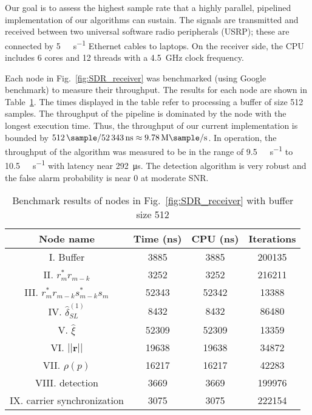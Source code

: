 Our goal is to assess the highest sample rate that a
highly parallel, pipelined implementation of our algorithms can sustain. 
The signals are transmitted and received between two universal software radio peripherals (USRP);
these are connected by \SI[per-mode=symbol]{5}{\giga\bits\per\second} Ethernet cables to
laptops.
On the receiver side, 
the CPU includes 6 cores and 12 threads with a \SI{4.5}{\giga\hertz}
clock frequency.

Each node in Fig.~\ref{fig:SDR_receiver} was benchmarked (using Google benchmark) to measure their throughput.
The results for each node are shown 
in Table~\ref{table:BM_function_nodes}.
The times displayed in the table
refer to processing a  buffer of size 512 samples.
The throughput of the 
pipeline is dominated by the node with the longest execution time.
Thus, the  throughput of our current implementation is bounded by
$\SI{512}{\sample}/\SI{52343}{\nano\second}  \approx \SI[per-mode=symbol]{9.78}{\mega\sample\per\second}$.
In operation, the throughput of the algorithm was measured to be in
the range of
\SI[per-mode=symbol]{9.5}{\mega\sample\per\second} to \SI[per-mode=symbol]{10.5}{\mega\sample\per\second} with latency near \SI{292}{\micro\second}.
The detection algorithm is very robust and the false alarm probability is near 0 at moderate SNR.

\begin{table}[t]
    \caption{Benchmark results of nodes in Fig.~\ref{fig:SDR_receiver} with buffer size 512}  %
    \centering %
    \begin{tabular}{c c c c} %
    \hline\hline %
    Node name & Time (ns) & CPU (ns) & Iterations \\ [0.5ex] %
    \hline %
    I. Buffer  & 3885 & 3885 & 200135 \\ %
    II. $r_m^*r_{m-k}$  & 3252 & 3252 & 216211 \\
    III. $r_m^*r_{m-k}s_{m-k}^*s_m$ & 52343 & 52342 & 13388 \\
    IV. $\hat{\delta}_{SL}^{(1)}$ & 8432 & 8432 & 86480 \\
    V. $\hat{\xi}$ & 52309 & 52309 & 13359 \\
    VI. $||\bm{r}||$ & 19638 & 19638 & 34872 \\ %
    VII. $\rho(p)$ & 16217 & 16217 & 42283 \\
    VIII. detection & 3669 & 3669 & 199976 \\
    IX. carrier synchronization & 3075 & 3075 & 222154  \\ [1ex]
    \hline
    \end{tabular}
    \label{table:BM_function_nodes} %
  \end{table}

